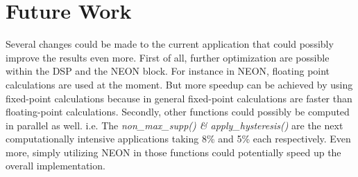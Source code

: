 \section{Future Work}
\label{sec:Future Work}
Several changes could be made to the current application that could possibly improve the results even more.
First of all, further optimization are possible within the DSP and the NEON block. 
For instance in NEON, floating point calculations are used at the moment. But more speedup can be achieved by using fixed-point calculations because in general fixed-point calculations are faster than floating-point calculations.
Secondly, other functions could possibly be computed in parallel as well.
i.e. The \textit{non\_max\_supp() \& apply\_hysteresis()} are the next computationally intensive applications taking 8\% and 5\% each respectively.
Even more, simply utilizing NEON in those functions could potentially speed up the overall implementation.